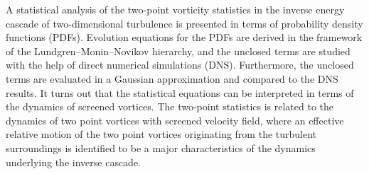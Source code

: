 A statistical analysis of the two-point vorticity statistics in the inverse energy cascade of two-dimensional turbulence is presented in terms of probability density functions (PDFs).
Evolution equations for the PDFs are derived in the framework of the Lundgren--Monin--Novikov hierarchy, and the unclosed terms are studied with the help of direct numerical simulations (DNS).
Furthermore, the unclosed terms are evaluated in a Gaussian approximation and compared to the DNS results.
It turns out that the statistical equations can be interpreted in terms of the dynamics of screened vortices.
The two-point statistics is related to the dynamics of two point vortices with screened velocity field, where an effective relative motion of the two point vortices originating from the turbulent surroundings is identified to be a major characteristics of the dynamics underlying the inverse cascade.
